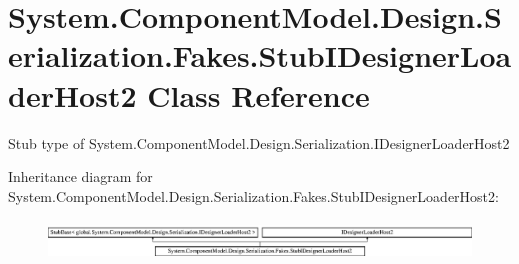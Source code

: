 \hypertarget{class_system_1_1_component_model_1_1_design_1_1_serialization_1_1_fakes_1_1_stub_i_designer_loader_host2}{\section{System.\-Component\-Model.\-Design.\-Serialization.\-Fakes.\-Stub\-I\-Designer\-Loader\-Host2 Class Reference}
\label{class_system_1_1_component_model_1_1_design_1_1_serialization_1_1_fakes_1_1_stub_i_designer_loader_host2}
}


Stub type of System.\-Component\-Model.\-Design.\-Serialization.\-I\-Designer\-Loader\-Host2 


Inheritance diagram for System.\-Component\-Model.\-Design.\-Serialization.\-Fakes.\-Stub\-I\-Designer\-Loader\-Host2\-:\begin{figure}[H]
\begin{center}
\leavevmode
\includegraphics[height=1.070746cm]{class_system_1_1_component_model_1_1_design_1_1_serialization_1_1_fakes_1_1_stub_i_designer_loader_host2}
\end{center}
\end{figure}
